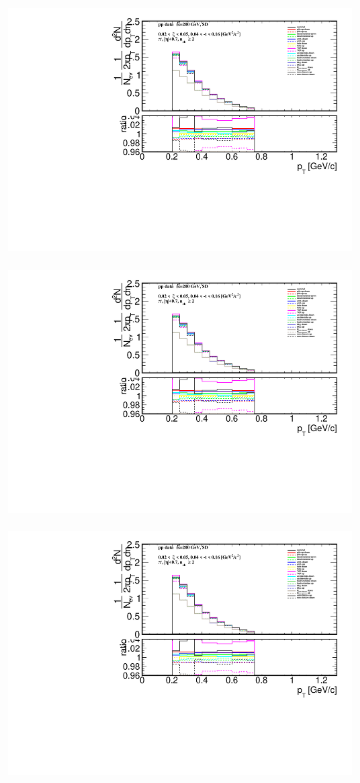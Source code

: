 \begin{figure}[h!]
		\centering
		\begin{subfigure}{.49\textwidth}
			\includegraphics[width=\textwidth,page=25]{chapters/chrgSTAR/img/syst/outPID_SDT.pdf}
		\end{subfigure}
		\begin{subfigure}{.49\textwidth}
			\includegraphics[width=\textwidth,page=26]{chapters/chrgSTAR/img/syst/outPID_SDT.pdf}
		\end{subfigure}
		\begin{subfigure}{.49\textwidth}
			\includegraphics[width=\textwidth,page=27]{chapters/chrgSTAR/img/syst/outPID_SDT.pdf}

\end{subfigure}
\end{figure}
